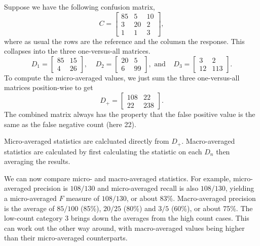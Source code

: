 Suppose we have the following confusion matrix, 
%
\begin{equation}
C = 
\left[
\begin{array}{ccc}
85 & 5 & 10
\\ 
3  & 20 & 2
\\ 
1  & 1  & 3
\end{array}
\right],
\end{equation}
%
where as usual the rows are the reference and the columsn the response.
This collapses into the three one-versus-all matrices.  
%
\begin{equation}
%
D_1 = \left[ 
\begin{array}{cc}
85 & 15 \\
 4 & 26
\end{array}
\right],
%
\ \ \ \ \
%
D_2 = \left[ 
\begin{array}{cc}
20 & 5 \\
 6 & 99
\end{array}
\right], \mbox{ and}
%
\ \ \ \ \
%
D_3 = \left[ 
\begin{array}{cc}
 3 & 2 \\
 12 & 113
\end{array}
\right].
%
\end{equation}
%
To compute the micro-averaged values, we just sum the three one-versus-all
matrices position-wise to get
%
\begin{equation}
D_+ = \left[ 
\begin{array}{cc}
108 & 22 \\
22 & 238
\end{array}
\right].
\end{equation}
%
The combined matrix always has the property that the false positive
value is the same as the false negative count (here 22).  


Micro-averaged statistics are calcluated directly from $D_+$.
Macro-averaged statistics are calculated by first calculating
the statistic on each $D_n$ then averaging the results.

We can now compare micro- and macro-averaged statistics.  For example,
micro-averaged precision is $108/130$ and micro-averaged recall is
also $108/130$, yielding a micro-averaged $F$ measure of $108/130$, or
about 83\%.  Macro-averaged precision is the average of $85/100$
(85\%), $20/25$ (80\%) and $3/5$ (60\%), or about 75\%.  The low-count
category 3 brings down the averages from the high count cases.  This
can work out the other way around, with macro-averaged values being
higher than their micro-averaged counterparts.


